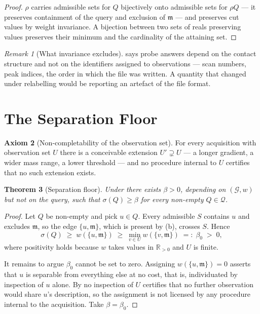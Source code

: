 \documentclass[11pt,a4paper]{article}
\newtheorem{theorem}{Theorem}[section]
\theoremstyle{definition}
\newtheorem{axiom}[theorem]{Axiom}
\theoremstyle{remark}
\newtheorem{remark}[theorem]{Remark}
\newcommand{\Gph}{\mathcal{G}}
\newcommand{\wt}{w}
\newcommand{\med}{\mathfrak{m}}
\newcommand{\flo}{\beta}
\newcommand{\sep}{\sigma}
\newcommand{\Qry}{\mathcal{Q}}               %
\begin{document}
\begin{proof}
$\rho$ carries admissible sets for $Q$ bijectively onto admissible sets
for $\rho Q$ --- it preserves containment of the query and exclusion of
$\med$ --- and preserves cut values by weight invariance. A bijection
between two sets of reals preserving values preserves their minimum and
the cardinality of the attaining set.
\end{proof}

\begin{remark}[What invariance excludes]\label{rem:relabel}
 says probe answers depend on the contact structure
and not on the identifiers assigned to observations --- scan numbers,
peak indices, the order in which the file was written. A quantity that
changed under relabelling would be reporting an artefact of the file
format.
\end{remark}

\section{The Separation Floor}
\label{sec:floor}

\begin{axiom}[Non-completability of the observation set]\label{ax:noncomplete}
For every acquisition with observation set $U$ there is a conceivable
extension $U' \supsetneq U$ --- a longer gradient, a wider mass range, a
lower threshold --- and no procedure internal to $U$ certifies that no
such extension exists.
\end{axiom}

\begin{theorem}[Separation floor]\label{thm:floor}
Under  there exists $\flo > 0$, depending on
$(\Gph,\wt)$ but not on the query, such that $\sep(Q) \geq \flo$ for
every non-empty $Q \in \Qry$.
\end{theorem}

\begin{proof}
Let $Q$ be non-empty and pick $u \in Q$. Every admissible $S$ contains
$u$ and excludes $\med$, so the edge $\{u,\med\}$, which is present by
(b), crosses $S$. Hence
\[
\sep(Q) \;\geq\; \wt(\{u,\med\}) \;\geq\; \min_{v \in U} \wt(\{v,\med\})
\;=:\; \flo_0 \;>\; 0 ,
\]
where positivity holds because $\wt$ takes values in
$\mathbb{R}_{>0}$ and $U$ is finite.

It remains to argue $\flo_0$ cannot be set to zero. Assigning
$\wt(\{u,\med\}) = 0$ asserts that $u$ is separable from everything else
at no cost, that is, individuated by inspection of $u$ alone. By
 no inspection of $U$ certifies that no further
observation would share $u$'s description, so the assignment is not
licensed by any procedure internal to the acquisition. Take
$\flo = \flo_0$.
\end{proof}
\end{document}
